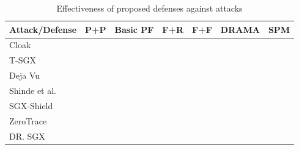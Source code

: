 \begin{table}
	\centering
	\caption{Effectiveness of proposed defenses against attacks}
	\label{tab:one}
	\begin{tabular}{@{}lllllll@{}}
		\toprule
		Attack/Defense & P+P & Basic PF & F+R & F+F & DRAMA & SPM \\ \midrule
		Cloak          &\cmark   &\xmark          &\cmark     &\cmark     &\xmark      &\xmark     \\
		T-SGX          &\xmark   &\cmark          &\xmark     &\xmark     &\cmark       &\xmark     \\
		Deja Vu        &\xmark   &\cmark          &\xmark     &\xmark     &\cmark       &\xmark     \\
		Shinde et al.  &\xmark   &\cmark          &\xmark     &\xmark     &\xmark       &\cmark     \\
		SGX-Shield     &\xmark   &\cmark          &\xmark     &\xmark     &\cmark       &\xmark     \\
		ZeroTrace      &\cmark   &\cmark          &\cmark     &\cmark     &\cmark       &\cmark     \\
		DR. SGX        &\cmark   &\xmark          &\cmark     &\cmark     &\xmark       &\xmark     \\
	\end{tabular}
\end{table}
